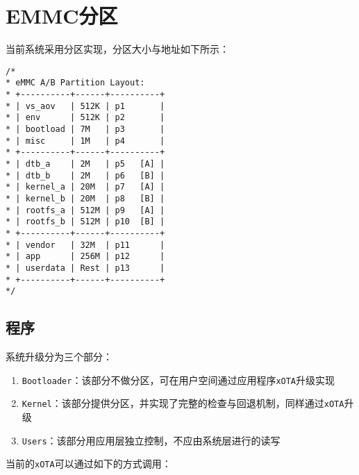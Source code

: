 \documentclass[UTF8]{ctexart}
\newcommand{\code}[1]{\colorbox{gray!10}{\lstinline[style=inlinecode]|#1|}}
\begin{document}
\section{EMMC分区}

当前系统采用分区实现，分区大小与地址如下所示：

\begin{lstlisting}
/*
* eMMC A/B Partition Layout:
* +----------+------+----------+
* | vs_aov   | 512K | p1       |
* | env      | 512K | p2       |
* | bootload | 7M   | p3       |
* | misc     | 1M   | p4       |
* +----------+------+----------+
* | dtb_a    | 2M   | p5   [A] |
* | dtb_b    | 2M   | p6   [B] |
* | kernel_a | 20M  | p7   [A] |
* | kernel_b | 20M  | p8   [B] |
* | rootfs_a | 512M | p9   [A] |
* | rootfs_b | 512M | p10  [B] |
* +----------+------+----------+
* | vendor   | 32M  | p11      |
* | app      | 256M | p12      |
* | userdata | Rest | p13      |
* +----------+------+----------+
*/  
\end{lstlisting}

\subsection{程序}

系统升级分为三个部分：

\begin{enumerate}
    \item \code{Bootloader}：该部分不做分区，可在用户空间通过应用程序\code{xOTA}升级实现
    \item \code{Kernel}：该部分提供分区，并实现了完整的检查与回退机制，同样通过\code{xOTA}升级
    \item \code{Users}：该部分用应用层独立控制，不应由系统层进行的读写
\end{enumerate}

当前的\code{xOTA}可以通过如下的方式调用：
\end{document}
